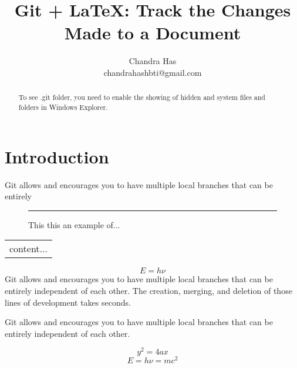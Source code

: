 \documentclass[a4paper,12pt]{article}
\title{Git + \LaTeX: Track the Changes Made to a Document}
\author{Chandra Has\\ \small chandrahashbti@gmail.com}\date{}
\begin{document}
\maketitle	

\begin{abstract}
To see .git folder, you need to enable the showing of hidden and system files and folders in Windows Explorer.
\end{abstract}

\section{Introduction}
Git allows and encourages you to have multiple local branches that can be entirely 

\begin{figure}[!h]\centering\rule{3cm}{3cm}
	\caption{This this an example of...}
\end{figure}

\begin{tabular}{c}
	content...
\end{tabular}


\begin{equation}E=h\nu\end{equation}
Git allows and encourages you to have multiple local branches that can be entirely independent of each other. The creation, merging, and deletion of those lines of development takes seconds.

Git allows and encourages you to have multiple local branches that can be entirely independent of each other. 

$$y^2=4ax$$
$$E=h\nu=mc^2$$
\end{document}
